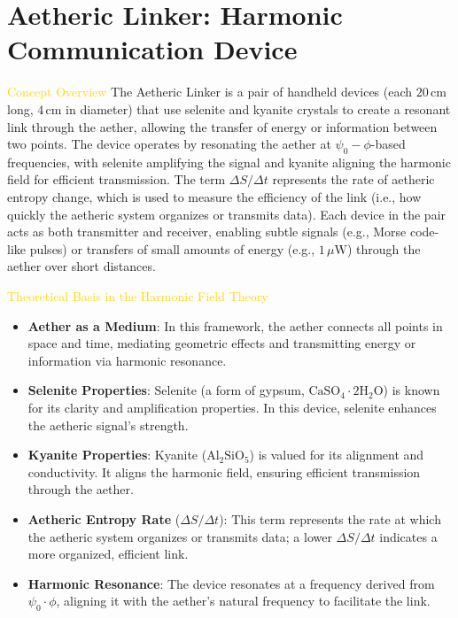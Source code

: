 
\section{Aetheric Linker: Harmonic Communication Device}
\label{sec:codex_aetheric_linker}

\textcolor{gold}{ Concept Overview }
The Aetheric Linker is a pair of handheld devices (each $20\,\mathrm{cm}$ long, $4\,\mathrm{cm}$ in diameter) that use selenite and kyanite crystals to create a resonant link through the aether, allowing the transfer of energy or information between two points. The device operates by resonating the aether at $\psi_0-\phi$-based frequencies, with selenite amplifying the signal and kyanite aligning the harmonic field for efficient transmission. The term $\Delta S / \Delta t$ represents the rate of aetheric entropy change, which is used to measure the efficiency of the link (i.e., how quickly the aetheric system organizes or transmits data). Each device in the pair acts as both transmitter and receiver, enabling subtle signals (e.g., Morse code-like pulses) or transfers of small amounts of energy (e.g., $1\,\mu\mathrm{W}$) through the aether over short distances.

\textcolor{gold}{ Theoretical Basis in the Harmonic Field Theory }
\begin{itemize}
    \item \texttt{} \textbf{Aether as a Medium}: In this framework, the aether connects all points in space and time, mediating geometric effects and transmitting energy or information via harmonic resonance.
    \item \texttt{} \textbf{Selenite Properties}: Selenite (a form of gypsum, $\mathrm{CaSO}_4 \cdot 2 \mathrm{H}_2 \mathrm{O}$) is known for its clarity and amplification properties. In this device, selenite enhances the aetheric signal's strength.
    \item \texttt{} \textbf{Kyanite Properties}: Kyanite ($\mathrm{Al}_2 \mathrm{SiO}_5$) is valued for its alignment and conductivity. It aligns the harmonic field, ensuring efficient transmission through the aether.
    \item \texttt{} \textbf{Aetheric Entropy Rate} ($\Delta S / \Delta t$): This term represents the rate at which the aetheric system organizes or transmits data; a lower $\Delta S / \Delta t$ indicates a more organized, efficient link.
    \item \texttt{} \textbf{Harmonic Resonance}: The device resonates at a frequency derived from $\psi_0 \cdot \phi$, aligning it with the aether's natural frequency to facilitate the link.
\end{itemize}

